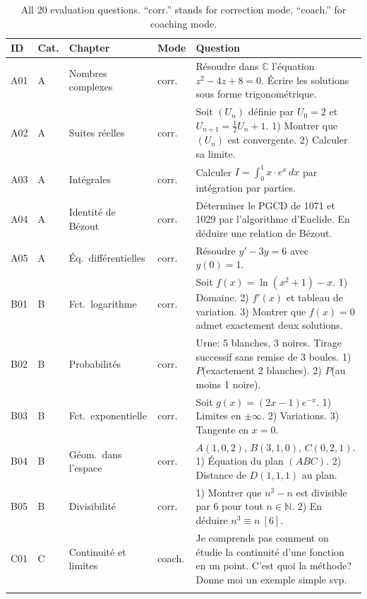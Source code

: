 \begin{table}[H]
\centering
\caption{All 20 evaluation questions. ``corr.'' stands for correction mode,
``coach.'' for coaching mode.}
\label{tab:app-questions}
\small
\begin{tabularx}{\textwidth}{l l l l X}
\toprule
\textbf{ID} & \textbf{Cat.} & \textbf{Chapter} & \textbf{Mode} & \textbf{Question} \\
\midrule
A01 & A & Nombres complexes & corr. &
Résoudre dans $\mathbb{C}$ l'équation $z^2 - 4z + 8 = 0$.
Écrire les solutions sous forme trigonométrique. \\
\addlinespace
A02 & A & Suites réelles & corr. &
Soit $(U_n)$ définie par $U_0 = 2$ et $U_{n+1} = \tfrac{1}{2}U_n + 1$.
1) Montrer que $(U_n)$ est convergente. 2) Calculer sa limite. \\
\addlinespace
A03 & A & Intégrales & corr. &
Calculer $I = \int_0^1 x \cdot e^x\, dx$ par intégration par parties. \\
\addlinespace
A04 & A & Identité de Bézout & corr. &
Déterminer le PGCD de 1071 et 1029 par l'algorithme d'Euclide.
En déduire une relation de Bézout. \\
\addlinespace
A05 & A & Éq.\ différentielles & corr. &
Résoudre $y' - 3y = 6$ avec $y(0) = 1$. \\
\midrule
B01 & B & Fct.\ logarithme & corr. &
Soit $f(x) = \ln(x^2+1) - x$. 1) Domaine. 2) $f'(x)$ et tableau de variation.
3) Montrer que $f(x)=0$ admet exactement deux solutions. \\
\addlinespace
B02 & B & Probabilités & corr. &
Urne: 5 blanches, 3 noires. Tirage successif sans remise de 3 boules.
1) $P$(exactement 2 blanches). 2) $P$(au moins 1 noire). \\
\addlinespace
B03 & B & Fct.\ exponentielle & corr. &
Soit $g(x)=(2x-1)e^{-x}$. 1) Limites en $\pm\infty$. 2) Variations.
3) Tangente en $x=0$. \\
\addlinespace
B04 & B & Géom.\ dans l'espace & corr. &
$A(1,0,2)$, $B(3,1,0)$, $C(0,2,1)$. 1) Équation du plan $(ABC)$.
2) Distance de $D(1,1,1)$ au plan. \\
\addlinespace
B05 & B & Divisibilité & corr. &
1) Montrer que $n^3-n$ est divisible par 6 pour tout $n\in\mathbb{N}$.
2) En déduire $n^3 \equiv n\ [6]$. \\
\midrule
C01 & C & Continuité et limites & coach. &
Je comprends pas comment on étudie la continuité d'une fonction en un
point. C'est quoi la méthode? Donne moi un exemple simple svp. \\
\addlinespace

\end{tabularx}
\end{table}
